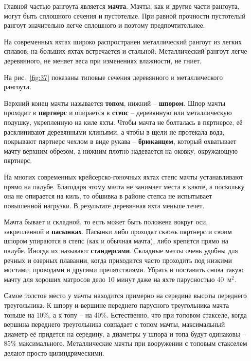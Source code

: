 \documentclass[a4paper, 12pt, twoside, final]{scrbook}
\begin{document}
Главной частью рангоута является \textbf{мачта}. Мачты, как и другие
части рангоута, могут быть сплошного сечения и пустотелые. При равной
прочности пустотелый рангоут значительно легче сплошного и поэтому
предпочтительнее.

На современных яхтах широко распространен металлический рангоут из
легких сплавов; на больших яхтах встречается и стальной. Металлический
рангоут легче деревянного, не меняет веса при изменениях влажности,
не гниет.

На рис.~\ref{fig:37}
показаны типовые сечения деревянного и металлического рангоута.

Верхний конец мачты называется \textbf{топом}, нижний \--- \textbf{шпором}.
Шпор мачты проходит в \textbf{пяртнерс} и опирается в \textbf{степс} \--- деревянную
или металлическую подушку, укрепленную на киле яхты. Чтобы мачта не
болталась в пяртнерсе, её расклинивают деревянными клиньями, а чтобы
в щели не протекала вода, покрывают пяртнерс чехлом в виде рукава
\--- \textbf{брюканцем}, который охватывает мачту верхним обрезом, а
нижним плотно надевается на оковку, окружающую пяртнерс.

На многих современных крейсерско-гоночных яхтах степс мачты устанавливают
прямо на палубе. Благодаря этому мачта не занимает места в каюте,
а поскольку она не опирается на киль, то обшивка в районе степса не
испытывает повышенной нагрузки. В результате деревянная яхта меньше
течет.

Мачта бывает и складной, то есть может быть положена вокруг оси, закрепленной
в \textbf{пасынках}. Пасынки либо проходят сквозь пяртнерс и своим
шпором упираются в степс (как и обычная мачта), либо крепятся прямо
на палубе. Иногда их называют \textbf{стандерсами}. Складные мачты очень удобны
для речных и озерных плавании, когда приходится часто проходить под
низкими мостами, проводами и другими препятствиями. Убрать и поставить
снова такую мачту для хороших матросов дело 10 минут даже на яхте
парусностью 40~м$^2$.

Самое толстое место у мачты находится примерно на середине высоты
переднего треугольника. К шпору и вершине переднего парусного треугольника
мачта тоньше на 10\%, а к топу \--- на 40\%. Естественно, что при
топовом стакселе, когда вершина переднего треугольника совпадает с
топом мачты, максимальный диаметр её придется на середину, а диаметры
у шпора и топа будут одинаковы \--- 85\% максимального. Металлические
мачты при вооружении с топовым стакселем делают просто цилиндрическими.
\end{document}
